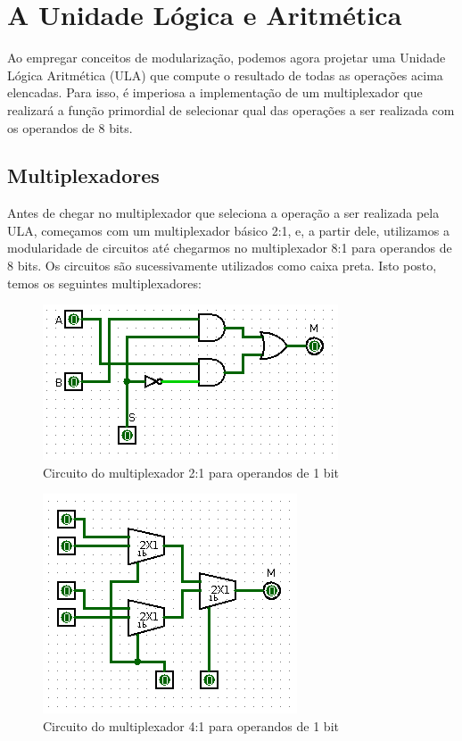 \documentclass[
	12pt,				%
	openright,			%
	twoside,			%
	a4paper,			%
	english,			%
	french,				%
	spanish,			%
	brazil,				%
	]{abntex2}
\begin{document}
\chapter{A Unidade Lógica e Aritmética}

Ao empregar conceitos de modularização, podemos agora projetar uma Unidade Lógica Aritmética (ULA) que compute o resultado de todas as operações acima elencadas. Para isso, é imperiosa a implementação de um multiplexador que realizará a função primordial de selecionar qual das operações a ser realizada com os operandos de 8 bits.

\section{Multiplexadores}

Antes de chegar no multiplexador que seleciona a operação a ser realizada pela ULA, começamos com um multiplexador básico 2:1, e, a partir dele, utilizamos a modularidade de circuitos até chegarmos no multiplexador 8:1 para operandos de 8 bits. Os circuitos são sucessivamente utilizados como caixa preta. Isto posto, temos os seguintes multiplexadores:

\begin{figure}[H]
	\begin{center}
	    \includegraphics[scale=0.6]{imagens/mux21.png}
	\end{center}
\caption{\label{mux21}Circuito do multiplexador 2:1 para operandos de 1 bit}
\end{figure}

\begin{figure}[H]
	\begin{center}
	    \includegraphics[scale=0.6]{imagens/mux41.png}
	\end{center}
\caption{\label{mux41}Circuito do multiplexador 4:1 para operandos de 1 bit}
\end{figure}
\end{document}
